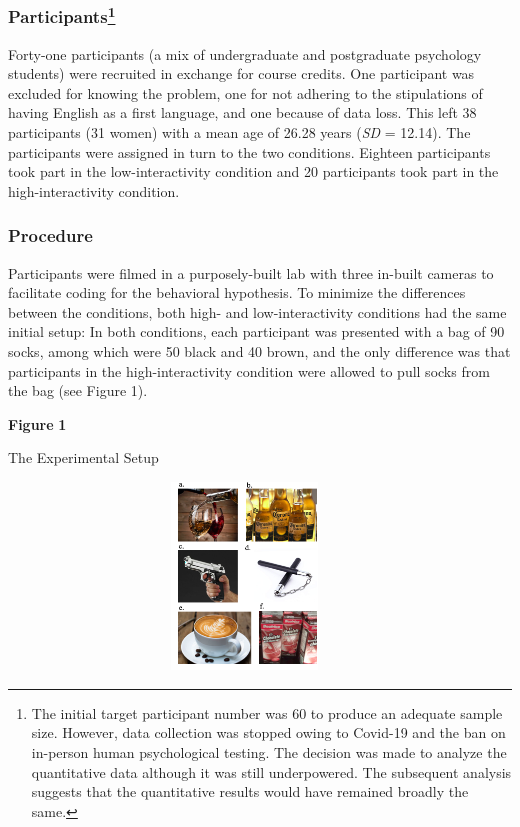 \hypertarget{participants}{%
\subsubsection[Participants]{\texorpdfstring{Participants\footnote{ The
  initial target participant number was 60 to produce an adequate sample
  size. However, data collection was stopped owing to Covid-19 and the
  ban on in-person human psychological testing. The decision was made to
  analyze the quantitative data although it was still underpowered. The
  subsequent analysis suggests that the quantitative results would have
  remained broadly the same.}}{Participants}}\label{participants}}

Forty-one participants (a mix of undergraduate and postgraduate
psychology students) were recruited in exchange for course credits. One
participant was excluded for knowing the problem, one for not adhering
to the stipulations of having English as a first language, and one
because of data loss. This left 38 participants (31 women) with a mean
age of 26.28 years (\emph{SD} = 12.14). The participants were assigned
in turn to the two conditions. Eighteen participants took part in the
low-interactivity condition and 20 participants took part in the
high-interactivity condition.

\hypertarget{procedure}{%
\subsubsection{Procedure}\label{procedure}}

Participants were filmed in a purposely-built lab with three in-built
cameras to facilitate coding for the behavioral hypothesis. To minimize
the differences between the conditions, both high- and low-interactivity
conditions had the same initial setup: In both conditions, each
participant was presented with a bag of 90 socks, among which were 50
black and 40 brown, and the only difference was that participants in the
high-interactivity condition were allowed to pull socks from the bag
(see Figure 1).

\textbf{Figure} \textbf{1}

The Experimental Setup

\includegraphics[width=4.92014in,height=1.96042in]{media/image1.png}

